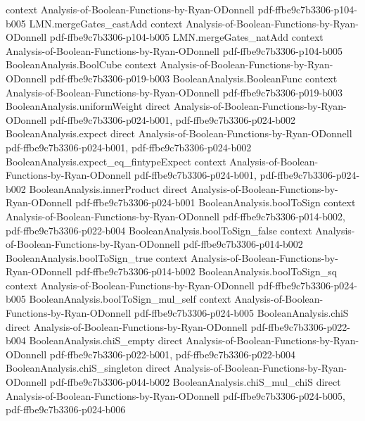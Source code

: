\begin{theorem}
  {context}
  {Analysis-of-Boolean-Functions-by-Ryan-ODonnell}
  {pdf-ffbe9c7b3306-p104-b005}
\proofstep
  {LMN.mergeGates_castAdd}
  {context}
  {Analysis-of-Boolean-Functions-by-Ryan-ODonnell}
  {pdf-ffbe9c7b3306-p104-b005}
\proofstep
  {LMN.mergeGates_natAdd}
  {context}
  {Analysis-of-Boolean-Functions-by-Ryan-ODonnell}
  {pdf-ffbe9c7b3306-p104-b005}
\proofstep
  {BooleanAnalysis.BoolCube}
  {context}
  {Analysis-of-Boolean-Functions-by-Ryan-ODonnell}
  {pdf-ffbe9c7b3306-p019-b003}
\proofstep
  {BooleanAnalysis.BooleanFunc}
  {context}
  {Analysis-of-Boolean-Functions-by-Ryan-ODonnell}
  {pdf-ffbe9c7b3306-p019-b003}
\proofstep
  {BooleanAnalysis.uniformWeight}
  {direct}
  {Analysis-of-Boolean-Functions-by-Ryan-ODonnell}
  {pdf-ffbe9c7b3306-p024-b001,
    pdf-ffbe9c7b3306-p024-b002}
\proofstep
  {BooleanAnalysis.expect}
  {direct}
  {Analysis-of-Boolean-Functions-by-Ryan-ODonnell}
  {pdf-ffbe9c7b3306-p024-b001,
    pdf-ffbe9c7b3306-p024-b002}
\proofstep
  {BooleanAnalysis.expect_eq_fintypeExpect}
  {context}
  {Analysis-of-Boolean-Functions-by-Ryan-ODonnell}
  {pdf-ffbe9c7b3306-p024-b001,
    pdf-ffbe9c7b3306-p024-b002}
\proofstep
  {BooleanAnalysis.innerProduct}
  {direct}
  {Analysis-of-Boolean-Functions-by-Ryan-ODonnell}
  {pdf-ffbe9c7b3306-p024-b001}
\proofstep
  {BooleanAnalysis.boolToSign}
  {context}
  {Analysis-of-Boolean-Functions-by-Ryan-ODonnell}
  {pdf-ffbe9c7b3306-p014-b002,
    pdf-ffbe9c7b3306-p022-b004}
\proofstep
  {BooleanAnalysis.boolToSign_false}
  {context}
  {Analysis-of-Boolean-Functions-by-Ryan-ODonnell}
  {pdf-ffbe9c7b3306-p014-b002}
\proofstep
  {BooleanAnalysis.boolToSign_true}
  {context}
  {Analysis-of-Boolean-Functions-by-Ryan-ODonnell}
  {pdf-ffbe9c7b3306-p014-b002}
\proofstep
  {BooleanAnalysis.boolToSign_sq}
  {context}
  {Analysis-of-Boolean-Functions-by-Ryan-ODonnell}
  {pdf-ffbe9c7b3306-p024-b005}
\proofstep
  {BooleanAnalysis.boolToSign_mul_self}
  {context}
  {Analysis-of-Boolean-Functions-by-Ryan-ODonnell}
  {pdf-ffbe9c7b3306-p024-b005}
\proofstep
  {BooleanAnalysis.chiS}
  {direct}
  {Analysis-of-Boolean-Functions-by-Ryan-ODonnell}
  {pdf-ffbe9c7b3306-p022-b004}
\proofstep
  {BooleanAnalysis.chiS_empty}
  {direct}
  {Analysis-of-Boolean-Functions-by-Ryan-ODonnell}
  {pdf-ffbe9c7b3306-p022-b001,
    pdf-ffbe9c7b3306-p022-b004}
\proofstep
  {BooleanAnalysis.chiS_singleton}
  {direct}
  {Analysis-of-Boolean-Functions-by-Ryan-ODonnell}
  {pdf-ffbe9c7b3306-p044-b002}
\proofstep
  {BooleanAnalysis.chiS_mul_chiS}
  {direct}
  {Analysis-of-Boolean-Functions-by-Ryan-ODonnell}
  {pdf-ffbe9c7b3306-p024-b005,
    pdf-ffbe9c7b3306-p024-b006}

\end{theorem}
